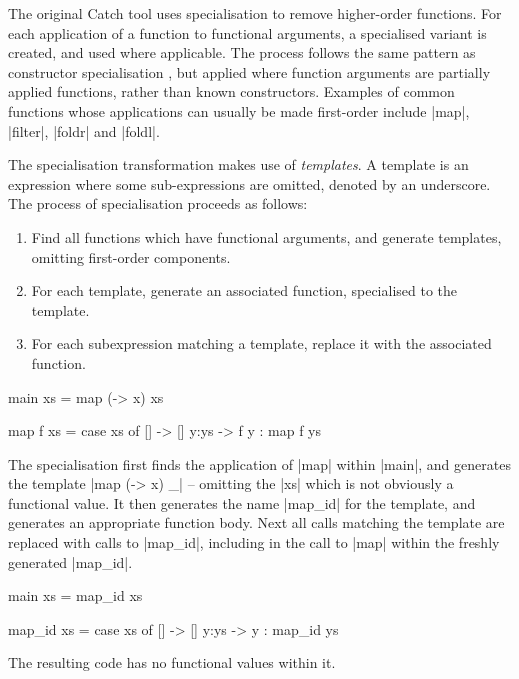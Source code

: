 \documentclass[preprint]{sigplanconf}
\begin{document}
The original Catch tool \cite{me:catch_tfp} uses specialisation to remove higher-order functions. For each application of a function to functional arguments, a specialised variant is created, and used where applicable. The process follows the same pattern as constructor specialisation \cite{spj:specconstr}, but applied where function arguments are partially applied functions, rather than known constructors. Examples of common functions whose applications can usually be made first-order include |map|, |filter|, |foldr| and |foldl|.

The specialisation transformation makes use of \textit{templates}. A template is an expression where some sub-expressions are omitted, denoted by an underscore. The process of specialisation proceeds as follows:

\begin{enumerate}
\item Find all functions which have functional arguments, and generate templates, omitting first-order components.
\item For each template, generate an associated function, specialised to the template.
\item For each subexpression matching a template, replace it with the associated function.
\end{enumerate}

\begin{example}
\begin{code}
main xs = map (\x -> x) xs

map f xs = case  xs of
                 []    -> []
                 y:ys  -> f y : map f ys
\end{code}

The specialisation first finds the application of |map| within |main|, and generates the template |map (\x -> x) _| -- omitting the |xs| which is not obviously a functional value. It then generates the name |map_id| for the template, and generates an appropriate function body. Next all calls matching the template are replaced with calls to |map_id|, including in the call to |map| within the freshly generated |map_id|.

\begin{code}
main xs = map_id xs

map_id xs = case  xs of
                  []    -> []
                  y:ys  -> y : map_id ys
\end{code}

The resulting code has no functional values within it.
\end{example}
\end{document}

